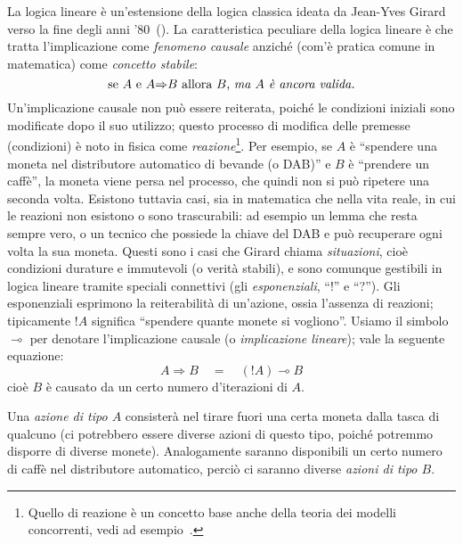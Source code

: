 \documentclass[12pt,a4paper,openright,twoside]{report}
\begin{document}
La logica lineare \`e un'estensione della logica classica ideata da Jean-Yves Girard verso la fine degli anni '80~(\cite{Gir87, GirLafTay89, Gir95}). La caratteristica peculiare della logica lineare \`e che tratta l'implicazione come \emph{fenomeno causale} anzich\'e (com'\`e pratica comune in matematica) come \emph{concetto stabile}:
$$
	\mbox{se }A\mbox{ e }A{\Rightarrow}B\mbox{ allora }B\mbox{, \emph{ma $A$ \`e ancora valida.}}
$$
Un'implicazione causale non pu\`o essere reiterata, poich\'e le condizioni iniziali sono modificate dopo il suo utilizzo; questo processo di modifica delle premesse (condizioni) \`e noto in fisica come \emph{reazione}\footnote{Quello di reazione \`e un concetto base anche della teoria dei modelli concorrenti, vedi ad esempio~\cite{Mil92, SanWal01}.}. Per esempio, se $A$ \`e ``spendere una moneta nel distributore automatico di bevande (o DAB)'' e $B$ \`e ``prendere un caff\`e'', la moneta viene persa nel processo, che quindi non si pu\`o ripetere una seconda volta. Esistono tuttavia casi, sia in matematica che nella vita reale, in cui le reazioni non esistono o sono trascurabili: ad esempio un lemma che resta sempre vero, o un tecnico che possiede la chiave del DAB e pu\`o recuperare ogni volta la sua moneta. Questi sono i casi che Girard chiama \emph{situazioni}, cio\`e condizioni durature e immutevoli (o {verit\`a stabili}), e sono comunque gestibili in logica lineare tramite speciali connettivi (gli \emph{esponenziali}, ``!'' e ``?''). Gli esponenziali esprimono la reiterabilit\`a di un'azione, ossia l'assenza di reazioni; tipicamente $!A$ significa ``spendere quante monete si vogliono''. Usiamo il simbolo $\multimap$ per denotare l'implicazione causale (o \emph{implicazione lineare}); vale la seguente equazione:
$$
	A \Rightarrow B \quad=\quad (!A) \multimap B
$$
cio\`e $B$ \`e causato da un certo numero d'iterazioni di $A$.

Una \emph{azione di tipo $A$} consister\`a nel tirare fuori una certa moneta dalla tasca di qualcuno (ci potrebbero essere diverse azioni di questo tipo, poich\'e potremmo disporre di diverse monete). Analogamente saranno disponibili un certo numero di caff\`e nel distributore automatico, perci\`o ci saranno diverse \emph{azioni di tipo $B$}.
\end{document}
